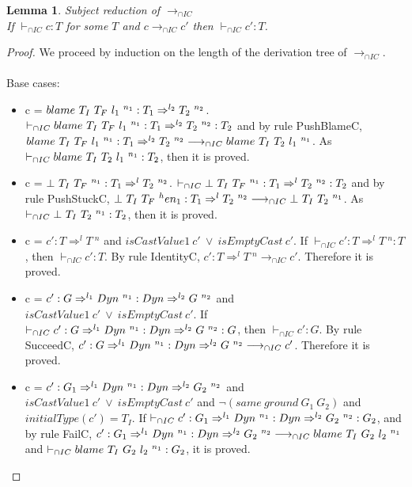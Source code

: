\documentclass[a4paper]{article}
\newtheorem{lemma}{Lemma}
\begin{document}
\begin{lemma}
\label{subjectreductionIC}
Subject reduction of $\longrightarrow_{\cap IC}$\\
If $\vdash_{\cap IC} c : T$ for some $T$ and $c \longrightarrow_{\cap IC} c'$ then $\vdash_{\cap IC} c' : T$.
\end{lemma}
\begin{proof}
We proceed by induction on the length of the derivation tree of $\longrightarrow_{\cap IC}$.\\\\
Base cases:
\begin{itemize}
    \item c = $blame\ T_I\ T_F\ l_1\ ^{n_1} : T_1 \Rightarrow^{l_2} T_2\ ^{n_2}$.
    $\vdash_{\cap IC} blame\ T_I\ T_F\ l_1\ ^{n_1} : T_1 \Rightarrow^{l_2} T_2\ ^{n_2} : T_2$ and by rule PushBlameC, $blame\ T_I\ T_F\ l_1\ ^{n_1} : T_1 \Rightarrow^{l_2} T_2\ ^{n_2} \longrightarrow_{\cap IC} blame\ T_I\ T_2\ l_1\ ^{n_1}$.
    As $\vdash_{\cap IC} blame\ T_I\ T_2\ l_1\ ^{n_1} : T_2$, then it is proved.
    \item c = $\bot\ T_I\ T_F\ ^{n_1} : T_1 \Rightarrow^{l} T_2\ ^{n_2}$.
    $\vdash_{\cap IC} \bot\ T_I\ T_F\ ^{n_1} : T_1 \Rightarrow^{l} T_2\ ^{n_2} : T_2$ and by rule PushStuckC, $\bot\ T_I\ T_F\ ^{h}e{n_1} : T_1 \Rightarrow^{l} T_2\ ^{n_2} \longrightarrow_{\cap IC} \bot\ T_I\ T_2\ ^{n_1}$.
    As $\vdash_{\cap IC} \bot\ T_I\ T_2\ ^{n_1} : T_2$, then it is proved.
    \item c = $c' : T \Rightarrow^l T\ ^n$ and $isCastValue1\ c'\ \lor\ isEmptyCast\ c'$.
    If $\vdash_{\cap IC} c' : T \Rightarrow^l T\ ^n : T$, then $\vdash_{\cap IC} c' : T$.
    By rule IdentityC, $c' : T \Rightarrow^l T\ ^n \longrightarrow_{\cap IC} c'$.
    Therefore it is proved.
    \item c = $c' : G \Rightarrow^{l_1} \Dyn\ ^{n_1} : \Dyn \Rightarrow^{l_2} G\ ^{n_2}$ and $isCastValue1\ c'\ \lor\ isEmptyCast\ c'$.
    If $\vdash_{\cap IC} c' : G \Rightarrow^{l_1} Dyn\ ^{n_1} : Dyn \Rightarrow^{l_2} G\ ^{n_2} : G$, then $\vdash_{\cap IC} c' : G$.
    By rule SucceedC, $c' : G \Rightarrow^{l_1} Dyn\ ^{n_1} : Dyn \Rightarrow^{l_2} G\ ^{n_2} \longrightarrow_{\cap IC} c'$.
    Therefore it is proved.
    \item c = $c' : G_1 \Rightarrow^{l_1} \Dyn\ ^{n_1} : \Dyn \Rightarrow^{l_2} G_2\ ^{n_2}$ and $isCastValue1\ c'\ \lor\ isEmptyCast\ c'$ and $\neg(same\ ground\ G_1\ G_2)$ and $initialType(c') = T_I$.
    If $\vdash_{\cap IC} c' : G_1 \Rightarrow^{l_1} Dyn\ ^{n_1} : Dyn \Rightarrow^{l_2} G_2\ ^{n_2} : G_2$, and by rule FailC, $c' : G_1 \Rightarrow^{l_1} Dyn\ ^{n_1} : Dyn \Rightarrow^{l_2} G_2\ ^{n_2} \longrightarrow_{\cap IC} blame\ T_I\ G_2\ l_2\ ^{n_1}$ and $\vdash_{\cap IC} blame\ T_I\ G_2\ l_2\ ^{n_1} : G_2$, it is proved.

\end{itemize}
\end{proof}
\end{document}
